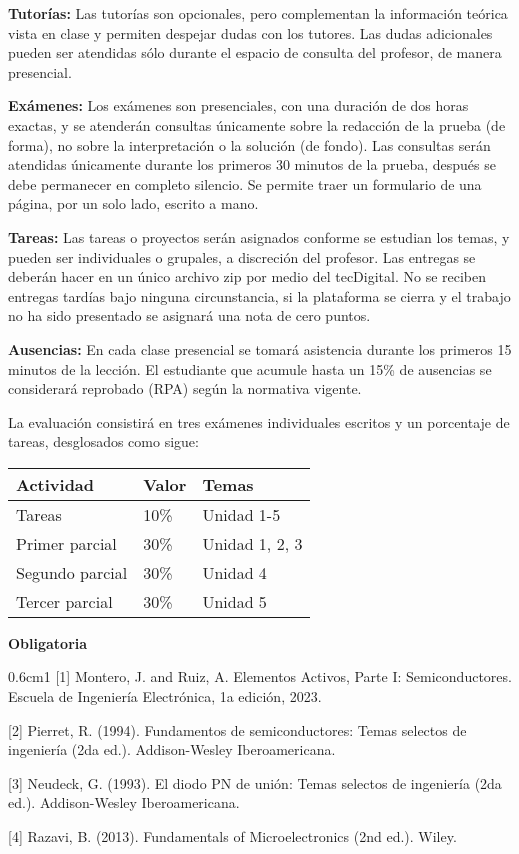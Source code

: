 \documentclass[11pt,oneside,letterpaper]{article}
\begin{document}
\textbf{Tutorías:} Las tutorías son opcionales, pero complementan la información teórica vista en clase y permiten despejar dudas con los tutores. Las dudas adicionales pueden ser atendidas sólo durante el espacio de consulta del profesor, de manera presencial.

\textbf{Exámenes:} Los exámenes son presenciales, con una duración de dos horas exactas, y se atenderán consultas únicamente sobre la redacción de la prueba (de forma), no sobre la interpretación o la solución (de fondo). Las consultas serán atendidas únicamente durante los primeros 30 minutos de la prueba, después se debe permanecer en completo silencio. Se permite traer un formulario de una página, por un solo lado, escrito a mano.

\textbf{Tareas:} Las tareas o proyectos serán asignados conforme se estudian los temas, y pueden ser individuales o grupales, a discreción del profesor. Las entregas se deberán hacer en un único archivo zip por medio del tecDigital. No se reciben entregas tardías bajo ninguna circunstancia, si la plataforma se cierra y el trabajo no ha sido presentado se asignará una nota de cero puntos.

\textbf{Ausencias:} En cada clase presencial se tomará asistencia durante los primeros 15 minutos de la lección. El estudiante que acumule hasta un 15\% de ausencias se considerará reprobado (RPA) según la normativa vigente. 


%
La evaluación consistirá en tres exámenes individuales escritos y un porcentaje de tareas, desglosados como sigue:

\vspace{5mm}
\begin{table}[H]
\centering
\begin{tabular}{lll}
  \hline \textbf{Actividad} & \textbf{Valor} & \textbf{Temas} \\
  \hline Tareas    & 10\% & Unidad 1-5  \\
  Primer parcial   & 30\% & Unidad 1, 2, 3  \\
  Segundo parcial  & 30\% & Unidad 4  \\
  Tercer parcial   & 30\% & Unidad 5  \\
  \hline 
\end{tabular}
\end{table}

%
\textbf{Obligatoria}

\begin{hangparas}{0.6cm}{1}
[1] Montero, J. and Ruiz, A. Elementos Activos, Parte I: Semiconductores. Escuela de Ingeniería Electrónica, 1a edición, 2023.

[2] Pierret, R. (1994). Fundamentos de semiconductores: Temas selectos de ingeniería (2da ed.).  Addison-Wesley Iberoamericana.

[3] Neudeck, G. (1993). El diodo PN de unión: Temas selectos de ingeniería (2da ed.).  Addison-Wesley Iberoamericana.

[4] Razavi, B. (2013). Fundamentals of Microelectronics (2nd ed.). Wiley.
\end{hangparas}
\end{document}
